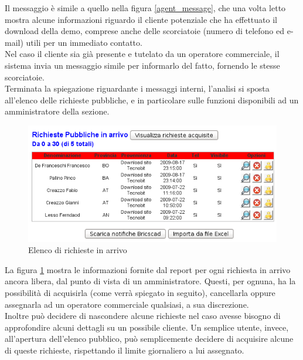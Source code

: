 \noindent
Il messaggio \`e simile a quello nella figura \ref{agent_message}, che una volta letto mostra alcune informazioni riguardo il cliente potenziale che ha effettuato il download della demo, comprese anche delle scorciatoie (numero di telefono ed e-mail) utili per un immediato contatto. \\
Nel caso il cliente sia gi\`a presente e tutelato da un operatore commerciale, il sistema invia un messaggio simile per informarlo del fatto, fornendo le stesse scorciatoie.  \\
Terminata la spiegazione riguardante i messaggi interni, l'analisi si sposta all'elenco delle richieste pubbliche, e in particolare sulle funzioni disponibili ad un amministratore della sezione.
\newpage

\begin{figure}[!ht]
\centering
  \includegraphics[scale=0.6]{./images/elencoRichiesteScreen.png}
\caption{Elenco di richieste in arrivo}
\label{elenco_richieste}
\end{figure}

\noindent
La figura \ref{elenco_richieste} mostra le informazioni fornite dal report per ogni richiesta in arrivo ancora libera, dal punto di vista di un amministratore. Questi, per ognuna, ha la possibilit\`a di acquisirla (come verr\`a spiegato in seguito), cancellarla oppure assegnarla ad un operatore commerciale qualsiasi, a sua discrezione. \\
Inoltre pu\`o decidere di nascondere alcune richieste nel caso avesse bisogno di approfondire alcuni dettagli su un possibile cliente.
Un semplice utente, invece, all'apertura dell'elenco pubblico, pu\`o semplicemente decidere di acquisire alcune di queste richieste, rispettando il limite giornaliero a lui assegnato. 

